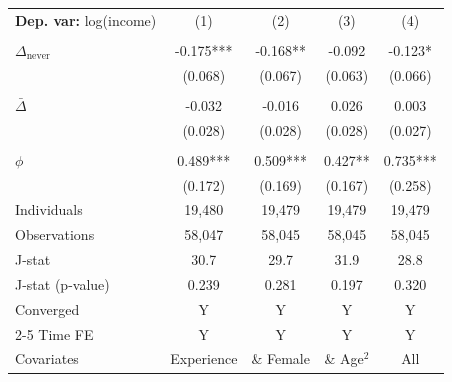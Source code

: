 \begin{tabular}{l cccc} \toprule  \textbf{Dep. var:}  log(income) 
                    &\multicolumn{1}{c}{(1)}   &\multicolumn{1}{c}{(2)}   &\multicolumn{1}{c}{(3)}   &\multicolumn{1}{c}{(4)}   \\
                    &               &               &               &               \\
\addlinespace
$\Delta_{\text{never}}$&      -0.175***&      -0.168** &      -0.092   &      -0.123*  \\
                    &     (0.068)   &     (0.067)   &     (0.063)   &     (0.066)   \\
                    &               &               &               &               \\
\addlinespace
$\bar{\Delta}$      &      -0.032   &      -0.016   &       0.026   &       0.003   \\
                    &     (0.028)   &     (0.028)   &     (0.028)   &     (0.027)   \\
                    &               &               &               &               \\
\addlinespace
$\phi$              &       0.489***&       0.509***&       0.427** &       0.735***\\
                    &     (0.172)   &     (0.169)   &     (0.167)   &     (0.258)   \\
\addlinespace
Individuals         &      19,480   &      19,479   &      19,479   &      19,479   \\
Observations        &      58,047   &      58,045   &      58,045   &      58,045   \\
J-stat              &        30.7   &        29.7   &        31.9   &        28.8   \\
J-stat (p-value)    &       0.239   &       0.281   &       0.197   &       0.320   \\
Converged           &           Y   &           Y   &           Y   &           Y   \\
\cmidrule{2-5} Time FE & Y & Y & Y & Y \\ Covariates & Experience & \& Female & \& Age$^2$ & All \\ \bottomrule \end{tabular}
